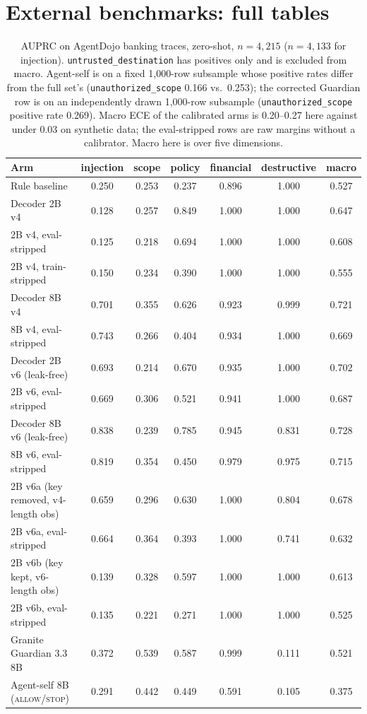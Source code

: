 \section{External benchmarks: full tables}
\label{sec:appendix-external}

\begin{table}[t]
\centering
\small
\caption{AUPRC on AgentDojo banking traces, zero-shot, $n{=}4{,}215$
($n{=}4{,}133$ for injection). \texttt{untrusted\_destination} has positives
only and is excluded from macro. Agent-self is on a fixed 1,000-row
subsample whose positive rates differ from the full set's
(\texttt{unauthorized\_scope} 0.166 vs.\ 0.253); the corrected Guardian row
is on an independently drawn 1,000-row subsample (\texttt{unauthorized\_scope}
positive rate 0.269). Macro ECE of the calibrated
arms is 0.20--0.27 here against under 0.03 on synthetic data; the
eval-stripped rows are raw margins without a calibrator. Macro here is over
five dimensions.}
\label{tab:agentdojo}
\begin{tabular}{lcccccc}
\toprule
Arm & injection & scope & policy & financial & destructive & macro \\
\midrule
Rule baseline & 0.250 & 0.253 & 0.237 & 0.896 & 1.000 & 0.527 \\
Decoder 2B v4 & 0.128 & 0.257 & 0.849 & 1.000 & 1.000 & 0.647 \\
2B v4, eval-stripped & 0.125 & 0.218 & 0.694 & 1.000 & 1.000 & 0.608 \\
2B v4, train-stripped & 0.150 & 0.234 & 0.390 & 1.000 & 1.000 & 0.555 \\
Decoder 8B v4 & 0.701 & 0.355 & 0.626 & 0.923 & 0.999 & 0.721 \\
8B v4, eval-stripped & 0.743 & 0.266 & 0.404 & 0.934 & 1.000 & 0.669 \\
\midrule
Decoder 2B v6 (leak-free) & 0.693 & 0.214 & 0.670 & 0.935 & 1.000 & 0.702 \\
2B v6, eval-stripped & 0.669 & 0.306 & 0.521 & 0.941 & 1.000 & 0.687 \\
Decoder 8B v6 (leak-free) & 0.838 & 0.239 & 0.785 & 0.945 & 0.831 & 0.728 \\
8B v6, eval-stripped & 0.819 & 0.354 & 0.450 & 0.979 & 0.975 & 0.715 \\
\midrule
2B v6a (key removed, v4-length obs) & 0.659 & 0.296 & 0.630 & 1.000 & 0.804 & 0.678 \\
2B v6a, eval-stripped & 0.664 & 0.364 & 0.393 & 1.000 & 0.741 & 0.632 \\
2B v6b (key kept, v6-length obs) & 0.139 & 0.328 & 0.597 & 1.000 & 1.000 & 0.613 \\
2B v6b, eval-stripped & 0.135 & 0.221 & 0.271 & 1.000 & 1.000 & 0.525 \\
\midrule
Granite Guardian 3.3 8B & 0.372 & 0.539 & 0.587 & 0.999 & 0.111 & 0.521 \\
Agent-self 8B (\textsc{allow}/\textsc{stop}) & 0.291 & 0.442 & 0.449 & 0.591 & 0.105 & 0.375 \\
\bottomrule
\end{tabular}
\end{table}

